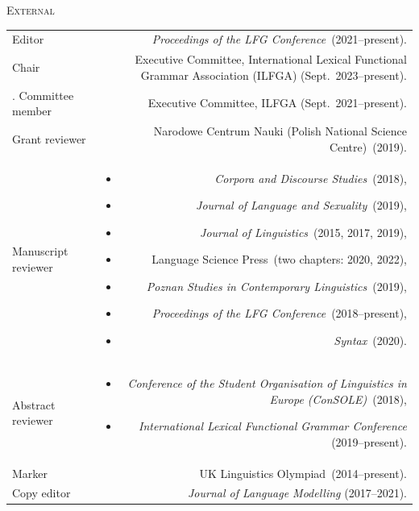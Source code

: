 \documentclass[11pt,a4paper]{article}
\makeatletter
\newlength{\rulelength}%
\newenvironment{cvsection}{%
  \setlength{\extrarowheight}{0.70ex}
  \begin{longtable}[l]{@{} L R @{}}
}{%
  \end{longtable}
}
\newlength{\squish}
\newenvironment{reviewlist}
{%
\vspace*{-8pt}%
\begin{itemize}[noitemsep,label={},nosep,left=0pt .. \parindent]%
}
{%
\end{itemize}
}
\newcommand{\Label}[1]{%
\textnormal{#1}%
}
\newcommand{\cvheading}[1]{\noindent{{\color{headercolor}\rule[0.4ex]{\rulelength}{2pt}\hspace*{9pt} \Large #1}}\vspace*{0.5\baselineskip}}
\newcommand{\cvsubhead}[1]{\noindent\hspace*{\rulelength}\hspace*{9pt} \textsc{#1}\vspace*{0.25\baselineskip}}
\makeatother
\begin{document}
\cvheading{Commissions of trust}

\cvsubhead{External}
\begin{cvsection}
  \Label{Editor} & \textit{Proceedings of the LFG Conference}~(2021--present).\\
  \Label{Chair} & Executive Committee, International Lexical Functional Grammar Association (ILFGA) (Sept.~2023--present).\\ .%
  \Label{Committee member} & Executive Committee, ILFGA (Sept.~2021--present).\\
\Label{Grant reviewer} &
                    Narodowe Centrum Nauki (Polish National Science Centre)~(2019).\\
\Label{Manuscript reviewer} &
                \begin{reviewlist}
                \item \textit{Corpora and Discourse Studies}~(2018),
                \item \textit{Journal of Language and Sexuality}~(2019),
                \item \textit{Journal of Linguistics}~(2015, 2017, 2019),
                \item Language Science Press~(two chapters: 2020, 2022),
                \item \textit{Poznan Studies in Contemporary Linguistics}~(2019),
                \item \textit{Proceedings of the LFG Conference}~(2018--present),
                \item  \textit{Syntax}~(2020).
                \end{reviewlist}
                 \\[\squish]
\Label{Abstract reviewer}   &
                \begin{reviewlist}
                \item \textit{Conference of the Student Organisation of Linguistics in Europe (ConSOLE)}~(2018),
                \item \textit{International Lexical Functional Grammar Conference} (2019--present).
                \end{reviewlist}
                \\[\squish]
\Label{Marker}      & UK Linguistics Olympiad~(2014--present).\\
\Label{Copy editor} & \textit{Journal of Language Modelling} (2017--2021).
\end{cvsection}
%
\vspace{0.2\squish}
\end{document}
